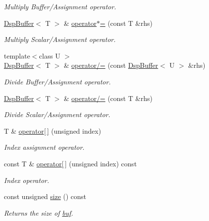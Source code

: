 \begin{DoxyCompactItemize}
\begin{DoxyCompactList}\small\item\em Multiply Buffer/\+Assignment operator. \end{DoxyCompactList}\item 
\hyperlink{class_smart_dsp_1_1_dsp_buffer}{Dsp\+Buffer}$<$ T $>$ \& \hyperlink{class_smart_dsp_1_1_dsp_buffer_a71344eecfd0e50516970640eb8aa21b3}{operator$\ast$=} (const T \&rhs)
\begin{DoxyCompactList}\small\item\em Multiply Scalar/\+Assignment operator. \end{DoxyCompactList}\item 
{\footnotesize template$<$class U $>$ }\\\hyperlink{class_smart_dsp_1_1_dsp_buffer}{Dsp\+Buffer}$<$ T $>$ \& \hyperlink{class_smart_dsp_1_1_dsp_buffer_adda7d64b126cce6f49519c4a1ec4dbfd}{operator/=} (const \hyperlink{class_smart_dsp_1_1_dsp_buffer}{Dsp\+Buffer}$<$ U $>$ \&rhs)
\begin{DoxyCompactList}\small\item\em Divide Buffer/\+Assignment operator. \end{DoxyCompactList}\item 
\hyperlink{class_smart_dsp_1_1_dsp_buffer}{Dsp\+Buffer}$<$ T $>$ \& \hyperlink{class_smart_dsp_1_1_dsp_buffer_a32633ee6a77ff31988e4cddd09dd1b88}{operator/=} (const T \&rhs)
\begin{DoxyCompactList}\small\item\em Divide Scalar/\+Assignment operator. \end{DoxyCompactList}\item 
T \& \hyperlink{class_smart_dsp_1_1_dsp_buffer_acbf2de89d89cdc53cca00e0b8cac75a0}{operator\mbox{[}$\,$\mbox{]}} (unsigned index)
\begin{DoxyCompactList}\small\item\em Index assignment operator. \end{DoxyCompactList}\item 
const T \& \hyperlink{class_smart_dsp_1_1_dsp_buffer_a5a82e83f2575d24d1dcc28961220262b}{operator\mbox{[}$\,$\mbox{]}} (unsigned index) const 
\begin{DoxyCompactList}\small\item\em Index operator. \end{DoxyCompactList}\item 
const unsigned \hyperlink{class_smart_dsp_1_1_dsp_buffer_af931c57c26c1f459cae47ca4b249d402}{size} () const 
\begin{DoxyCompactList}\small\item\em Returns the size of \hyperlink{class_smart_dsp_1_1_dsp_buffer_a7abb8184e08f4c9762f66bc75dcd3a6a}{buf}. \end{DoxyCompactList}\item 

\end{DoxyCompactItemize}
